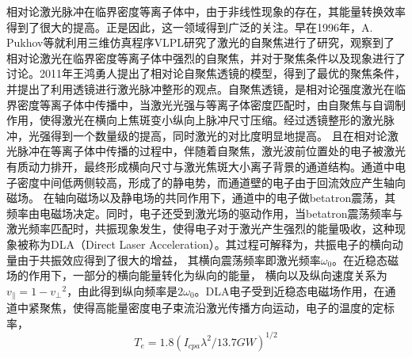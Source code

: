 相对论激光脉冲在临界密度等离子体中，由于非线性现象的存在，其能量转换效率得到了很大的提高。正是因此，这一领域得到广泛的关注。早在1996年，A. Pukhov等就利用三维仿真程序VLPL研究了激光的自聚焦\cite{pukhov1996relativistic}进行了研究，观察到了相对论激光在临界密度等离子体中强烈的自聚焦，并对于聚焦条件以及现象进行了讨论。2011年王鸿勇人提出了相对论自聚焦透镜的模型\cite{wang2011laser}，得到了最优的聚焦条件，并提出了利用透镜进行激光脉冲整形的观点。自聚焦透镜，是相对论强度激光在临界密度等离子体中传播中，当激光光强与等离子体密度匹配时，由自聚焦与自调制作用，使得激光在横向上焦斑变小纵向上脉冲尺寸压缩。经过透镜整形的激光脉冲，光强得到一个数量级的提高，同时激光的对比度明显地提高。
且在相对论激光脉冲在等离子体中传播的过程中，伴随着自聚焦，激光波前位置处的电子被激光有质动力排开，最终形成横向尺寸与激光焦斑大小离子背景的通道结构。通道中电子密度中间低两侧较高，形成了的静电势，而通道壁的电子由于回流效应产生轴向磁场。
在轴向磁场以及静电场的共同作用下，通道中的电子做betatron震荡，其频率由电磁场决定。同时，电子还受到激光场的驱动作用，当betatron震荡频率与激光频率匹配时，共振现象发生，使得电子对于激光产生强烈的能量吸收，这种现象被称为DLA（Direct Laser Acceleration）\cite{pukhov1998relativistic,pukhov1999particle}。其过程可解释为，共振电子的横向动量由于共振效应得到了很大的增益， 其横向震荡频率即激光频率$\omega_0$。在近稳态磁场的作用下，一部分的横向能量转化为纵向的能量， 横向以及纵向速度关系为$v_{\parallel} = 1- {v_{\perp}}^2$，由此得到纵向频率是$2 \omega_0$。DLA电子受到近稳态电磁场作用，在通道中紧聚焦，使得高能量密度电子束流沿激光传播方向运动，电子的温度的定标率，
\begin{equation}
\label{eqn:DLAtemperature}
T_e = 1.8(I_{cpa} {\lambda}^2/{13.7}GW)^{1/2}
\end{equation} 




